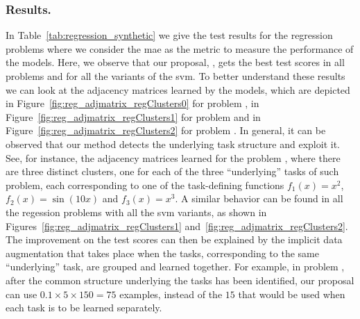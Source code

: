 \subsubsection*{Results.}
%
In Table~\ref{tab:regression_synthetic} we give the test results for the regression problems where we consider the \acrshort{mae} as the metric to measure the performance of the models.
%
Here, we observe that our proposal, , gets the best test scores in all problems and for all the variants of the \acrshort{svm}.
To better understand these results we can look at the adjacency matrices learned by the  models, which are depicted in Figure~\ref{fig:reg_adjmatrix_regClusters0} for problem , in Figure~\ref{fig:reg_adjmatrix_regClusters1} for problem  and in Figure~\ref{fig:reg_adjmatrix_regClusters2} for problem .
%
In general, it can be observed that our method detects the underlying task structure and exploit it.
See, for instance, the adjacency matrices learned for the problem , where there are three distinct clusters, one for each of the three ``underlying'' tasks of such problem, each corresponding to one of the task-defining functions $f_1(x) = x^2$,  $f_2(x) = \sin(10x)$ and $f_3(x) = x^3$.
%
A similar behavior can be found in all the regession problems with all the \acrshort{svm} variants, as shown in Figures~\ref{fig:reg_adjmatrix_regClusters1} and~\ref{fig:reg_adjmatrix_regClusters2}.
%
The improvement on the test scores can then be explained by the implicit data augmentation that takes place when the tasks, corresponding to the same ``underlying'' task, are grouped and learned together.
%
For example, in problem , after the common structure underlying the tasks has been identified, our proposal can use $0.1 \times 5 \times 150 = 75$ examples, instead of the $15$ that would be used when each task is to be learned separately.
%

